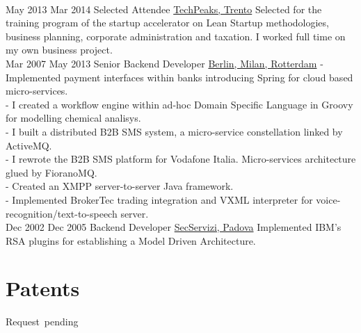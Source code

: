 \documentclass[letterpaper, 7pt]{twentysecondcv} %
\begin{document}
\begin{twenty}
{{    }
        }
     \\
     \twentyitem
   		{May 2013}
		{Mar 2014}
        {Selected Attendee}
        {\href{https://www.repubblica.it/rubriche/startup-stories/2013/12/02/news/incubatore_startup-72502909/}{TechPeaks, Trento}}
        {}
        {
Selected for the training program of the startup accelerator on Lean Startup methodologies, business planning, corporate administration and taxation. I worked full time on my own business project.
    	}
    	\\
     \twentyitem
   		{Mar 2007}
		{May 2013}
        {Senior Backend Developer}
        {\href{}{Berlin, Milan, Rotterdam}}
        {}
        {
- Implemented payment interfaces within banks introducing Spring for cloud based micro-services.
        \\
- I created a workflow engine within ad-hoc Domain Specific Language in Groovy for modelling chemical analisys.
        \\
- I built a distributed B2B SMS system, a micro-service constellation linked by ActiveMQ.
        \\
- I rewrote the B2B SMS platform for Vodafone Italia. Micro-services architecture glued by FioranoMQ.
        \\
- Created an XMPP server-to-server Java framework.
        \\
- Implemented BrokerTec trading integration and VXML interpreter for  voice-recognition/text-to-speech server.
	}
   	\\
     \twentyitem
   		{Dec 2002}
		{Dec 2005}
        {Backend Developer}
        {\href{}{SecServizi, Padova}}
        {}
        {
    Implemented IBM's RSA plugins for establishing a Model Driven Architecture.
       	}

\end{twenty}

\section{Patents}
\begin{twenty}
{Request~pending}
\\
\\
\end{twenty}
\end{document}
